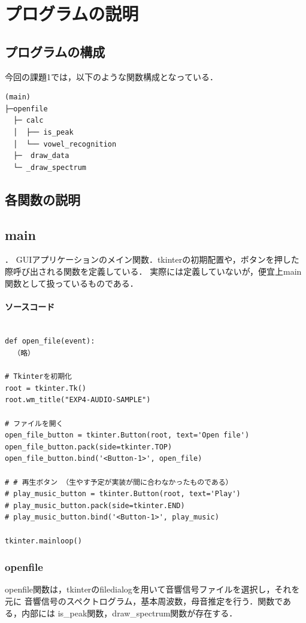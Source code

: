 \documentclass[11pt,a4j]{jarticle}%
\begin{document}
\section{プログラムの説明}
\subsection{プログラムの構成}
今回の課題1では，以下のような関数構成となっている．
\begin{verbatim}
(main)
├─openfile
  ├─ calc
  │  ├── is_peak
  │  └── vowel_recognition
  ├─  draw_data
  └─ _draw_spectrum
\end{verbatim}

\subsection{各関数の説明}
\subsection{main}．
GUIアプリケーションのメイン関数．tkinterの初期配置や，ボタンを押した際呼び出される関数を定義している．
実際には定義していないが，便宜上main関数として扱っているものである．
\paragraph*{ソースコード}
\begin{lstlisting}[caption=main関数,label=openfile]

def open_file(event):
  （略）

# Tkinterを初期化
root = tkinter.Tk()
root.wm_title("EXP4-AUDIO-SAMPLE")

# ファイルを開く
open_file_button = tkinter.Button(root, text='Open file')
open_file_button.pack(side=tkinter.TOP)
open_file_button.bind('<Button-1>', open_file)

# # 再生ボタン （生やす予定が実装が間に合わなかったものである）
# play_music_button = tkinter.Button(root, text='Play')
# play_music_button.pack(side=tkinter.END)
# play_music_button.bind('<Button-1>', play_music)

tkinter.mainloop()
\end{lstlisting}
\subsubsection{openfile}
openfile関数は，tkinterのfiledialogを用いて音響信号ファイルを選択し，それを元に
音響信号のスペクトログラム，基本周波数，母音推定を行う．関数である，内部には
is\_peak関数，draw\_spectrum関数が存在する．
\end{document}
